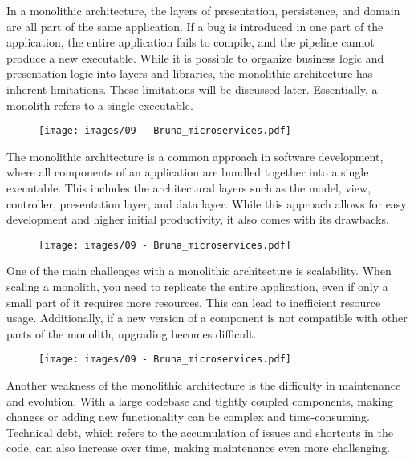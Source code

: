 In a monolithic architecture, the layers of presentation, persistence,
and domain are all part of the same application. If a bug is introduced
in one part of the application, the entire application fails to compile,
and the pipeline cannot produce a new executable. While it is possible
to organize business logic and presentation logic into layers and
libraries, the monolithic architecture has inherent limitations. These
limitations will be discussed later. Essentially, a monolith refers to a
single executable.

\begin{figure}[!h]
    \centering
    \texttt{[image: images/09 - Bruna\_microservices.pdf]}
\end{figure}

The monolithic architecture is a common approach in software
development, where all components of an application are bundled together
into a single executable. This includes the architectural layers such as
the model, view, controller, presentation layer, and data layer. While
this approach allows for easy development and higher initial
productivity, it also comes with its drawbacks.

\begin{figure}[!h]
    \centering
    \texttt{[image: images/09 - Bruna\_microservices.pdf]}
\end{figure}

One of the main challenges with a monolithic architecture is
scalability. When scaling a monolith, you need to replicate the entire
application, even if only a small part of it requires more resources.
This can lead to inefficient resource usage. Additionally, if a new
version of a component is not compatible with other parts of the
monolith, upgrading becomes difficult.

\begin{figure}[!h]
    \centering
    \texttt{[image: images/09 - Bruna\_microservices.pdf]}
\end{figure}

Another weakness of the monolithic architecture is the difficulty in
maintenance and evolution. With a large codebase and tightly coupled
components, making changes or adding new functionality can be complex
and time-consuming. Technical debt, which refers to the accumulation of
issues and shortcuts in the code, can also increase over time, making
maintenance even more challenging.

